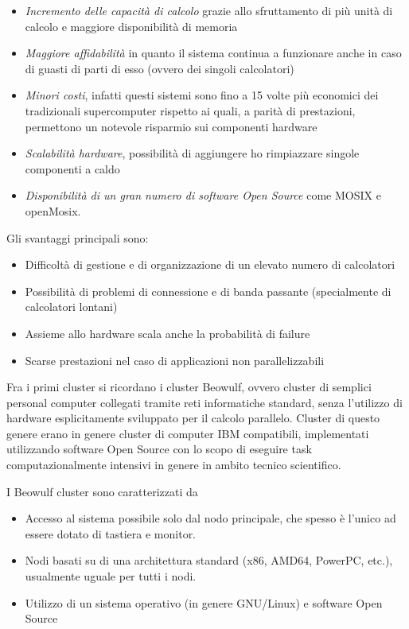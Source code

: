 \documentclass[italian,]{article}
\providecommand{\tightlist}{%
  \setlength{\itemsep}{0pt}\setlength{\parskip}{0pt}}
\begin{document}
\begin{itemize}
\tightlist
\item
  \emph{Incremento delle capacità di calcolo} grazie allo sfruttamento
  di più unità di calcolo e maggiore disponibilità di memoria
\item
  \emph{Maggiore affidabilità} in quanto il sistema continua a
  funzionare anche in caso di guasti di parti di esso (ovvero dei
  singoli calcolatori)
\item
  \emph{Minori costi}, infatti questi sistemi sono fino a 15 volte più
  economici dei tradizionali supercomputer rispetto ai quali, a parità
  di prestazioni, permettono un notevole risparmio sui componenti
  hardware
\item
  \emph{Scalabilità hardware}, possibilità di aggiungere ho rimpiazzare
  singole componenti a caldo
\item
  \emph{Disponibilità di un gran numero di software Open Source} come
  MOSIX e openMosix.
\end{itemize}

Gli svantaggi principali sono:

\begin{itemize}
\tightlist
\item
  Difficoltà di gestione e di organizzazione di un elevato numero di
  calcolatori
\item
  Possibilità di problemi di connessione e di banda passante
  (specialmente di calcolatori lontani)
\item
  Assieme allo hardware scala anche la probabilità di failure
\item
  Scarse prestazioni nel caso di applicazioni non parallelizzabili
\end{itemize}

Fra i primi cluster si ricordano i cluster Beowulf, ovvero cluster di
semplici personal computer collegati tramite reti informatiche standard,
senza l'utilizzo di hardware esplicitamente sviluppato per il calcolo
parallelo. Cluster di questo genere erano in genere cluster di computer
IBM compatibili, implementati utilizzando software Open Source con lo
scopo di eseguire task computazionalmente intensivi in genere in ambito
tecnico scientifico.

I Beowulf cluster sono caratterizzati da

\begin{itemize}
\tightlist
\item
  Accesso al sistema possibile solo dal nodo principale, che spesso è
  l'unico ad essere dotato di tastiera e monitor.
\item
  Nodi basati su di una architettura standard (x86, AMD64, PowerPC,
  etc.), usualmente uguale per tutti i nodi.
\item
  Utilizzo di un sistema operativo (in genere GNU/Linux) e software Open
  Source
\end{itemize}
\end{document}
